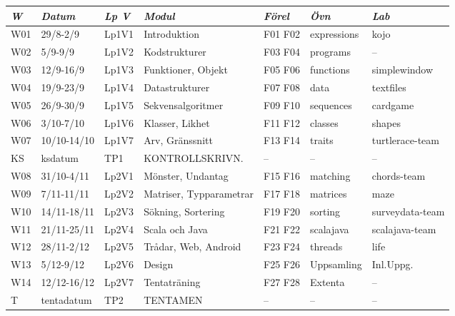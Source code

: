 \begin{tabular}{l|l|l|l|l|l|l}
\textit{W} & \textit{Datum} & \textit{Lp V} & \textit{Modul} & \textit{Förel} & \textit{Övn} & \textit{Lab} \\ \hline \hline
W01 & 29/8-2/9    & Lp1V1 & Introduktion            & F01 F02 & expressions & kojo            \\
W02 & 5/9-9/9     & Lp1V2 & Kodstrukturer           & F03 F04 & programs    & --              \\
W03 & 12/9-16/9   & Lp1V3 & Funktioner, Objekt      & F05 F06 & functions   & simplewindow    \\
W04 & 19/9-23/9   & Lp1V4 & Datastrukturer          & F07 F08 & data        & textfiles       \\
W05 & 26/9-30/9   & Lp1V5 & Sekvensalgoritmer       & F09 F10 & sequences   & cardgame        \\
W06 & 3/10-7/10   & Lp1V6 & Klasser, Likhet         & F11 F12 & classes     & shapes          \\
W07 & 10/10-14/10 & Lp1V7 & Arv, Gränssnitt         & F13 F14 & traits      & turtlerace-team \\
KS  & ksdatum     & TP1   & KONTROLLSKRIVN.         & --      & --          & --              \\
W08 & 31/10-4/11  & Lp2V1 & Mönster, Undantag       & F15 F16 & matching    & chords-team     \\
W09 & 7/11-11/11  & Lp2V2 & Matriser, Typparametrar & F17 F18 & matrices    & maze            \\
W10 & 14/11-18/11 & Lp2V3 & Sökning, Sortering      & F19 F20 & sorting     & surveydata-team \\
W11 & 21/11-25/11 & Lp2V4 & Scala och Java          & F21 F22 & scalajava   & scalajava-team  \\
W12 & 28/11-2/12  & Lp2V5 & Trådar, Web, Android    & F23 F24 & threads     & life            \\
W13 & 5/12-9/12   & Lp2V6 & Design                  & F25 F26 & Uppsamling  & Inl.Uppg.       \\
W14 & 12/12-16/12 & Lp2V7 & Tentaträning            & F27 F28 & Extenta     & --              \\
T   & tentadatum  & TP2   & TENTAMEN                & --      & --          & --              \\
\end{tabular}
